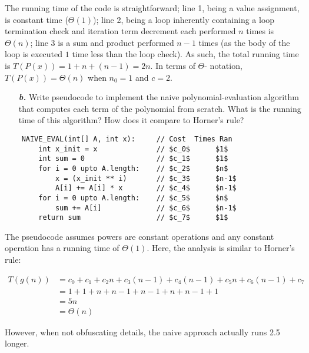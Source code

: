 \documentclass[a4paper,11pt]{article}
\theoremstyle{mytheor}
\begin{document}
The running time of the code is straightforward; line 1, being a value
assignment, is constant time ($\Theta (1)$); line 2, being a loop inherently
containing a loop termination check and iteration term decrement each performed 
$n$ times is $\Theta(n)$; line 3 is a sum and product performed $n-1$ times (as
the body of the loop is executed $1$ time less than the loop check). As such,
the total running time is $T(P(x)) = 1 + n + (n-1) = 2n$. In terms of $\Theta$-
notation, $T(P(x)) = \Theta(n)$ when $n_0 = 1$ and $c = 2$.

\begin{framed}
    \begin{enumerate}
        \item[\textbf{\textit{b.}}] Write pseudocode to implement the naive
            polynomial-evaluation algorithm that computes each term of the
            polynomial from scratch. What is the running time of this algorithm?
            How does it compare to Horner's rule?
    \end{enumerate}
\end{framed}

\begin{verbatim}
    NAIVE_EVAL(int[] A, int x):     // Cost  Times Ran
        int x_init = x              // $c_0$      $1$
        int sum = 0                 // $c_1$      $1$
        for i = 0 upto A.length:    // $c_2$      $n$
            x = (x_init ** i)       // $c_3$      $n-1$
            A[i] += A[i] * x        // $c_4$      $n-1$
        for i = 0 upto A.length:    // $c_5$      $n$
            sum += A[i]             // $c_6$      $n-1$
        return sum                  // $c_7$      $1$
\end{verbatim}
The pseudocode assumes powers are constant operations and any constant 
operation has a running time of $\Theta(1)$. Here, the analysis is similar to 
Horner's rule: 

\begin{align}
    T(g(n)) & = c_0 + c_1 + c_2 n + c_3 (n-1) + c_4 (n-1) + c_5 n + c_6 (n-1) 
    + c_7 \\
            & = 1 + 1 + n + n - 1 + n - 1 + n + n - 1 + 1 \\
            & = 5n \\
            & = \Theta(n)
\end{align}

However, when not obfuscating details, the naive approach actually runs 2.5
longer. 
\end{document}
